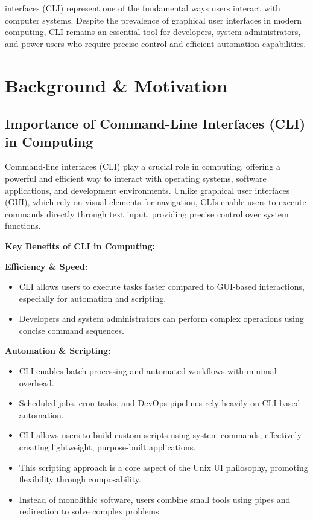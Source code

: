  interfaces (CLI) represent one of the fundamental ways users interact with computer systems. Despite the prevalence of graphical user interfaces in modern computing, CLI remains an essential tool for developers, system administrators, and power users who require precise control and efficient automation capabilities.


\section{Background \& Motivation}

\subsection{Importance of Command-Line Interfaces (CLI) in Computing}

Command-line interfaces (CLI) play a crucial role in computing, offering a powerful and efficient way to interact with operating systems, software applications, and development environments. Unlike graphical user interfaces (GUI), which rely on visual elements for navigation, CLIs enable users to execute commands directly through text input, providing precise control over system functions.

\textbf{Key Benefits of CLI in Computing:}

\textbf{Efficiency \& Speed:}
\begin{itemize}
	\item CLI allows users to execute tasks faster compared to GUI-based interactions, especially for automation and scripting.
	\item Developers and system administrators can perform complex operations using concise command sequences.
\end{itemize}

\textbf{Automation \& Scripting:}
\begin{itemize}
	\item CLI enables batch processing and automated workflows with minimal overhead.
	\item Scheduled jobs, cron tasks, and DevOps pipelines rely heavily on CLI-based automation.
	\item CLI allows users to build custom scripts using system commands, effectively creating lightweight, purpose-built applications.
	\item This scripting approach is a core aspect of the Unix UI philosophy, promoting flexibility through composability.
	\item Instead of monolithic software, users combine small tools using pipes and redirection to solve complex problems.
\end{itemize}

